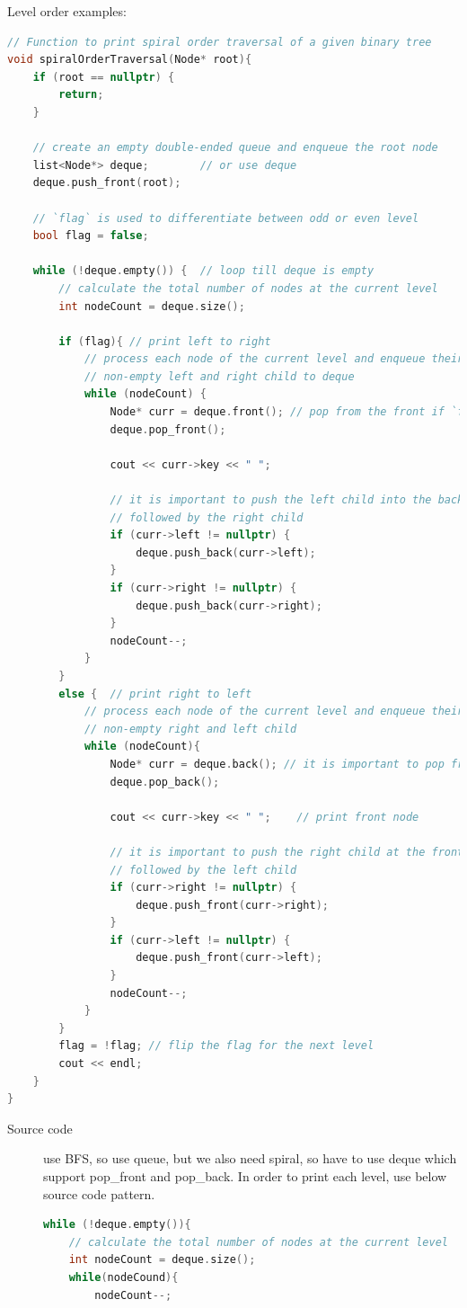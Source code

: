 \documentclass[a4paper,11pt,twoside]{book}
\begin{document}
	\par Level order examples:
\begin{lstlisting}[frame=single, language=c++]
// Function to print spiral order traversal of a given binary tree
void spiralOrderTraversal(Node* root){
	if (root == nullptr) {
		return;
	}
	
	// create an empty double-ended queue and enqueue the root node
	list<Node*> deque;        // or use deque
	deque.push_front(root);
	
	// `flag` is used to differentiate between odd or even level
	bool flag = false;
	
	while (!deque.empty()) {  // loop till deque is empty
		// calculate the total number of nodes at the current level
		int nodeCount = deque.size();
		
		if (flag){ // print left to right
			// process each node of the current level and enqueue their
			// non-empty left and right child to deque
			while (nodeCount) {
				Node* curr = deque.front(); // pop from the front if `flag` is true
				deque.pop_front();
				
				cout << curr->key << " ";
				
				// it is important to push the left child into the back,
				// followed by the right child
				if (curr->left != nullptr) {
					deque.push_back(curr->left);
				}
				if (curr->right != nullptr) {
					deque.push_back(curr->right);
				}
				nodeCount--;
			}
		}
		else {  // print right to left
			// process each node of the current level and enqueue their
			// non-empty right and left child
			while (nodeCount){
				Node* curr = deque.back(); // it is important to pop from the back
				deque.pop_back();
				
				cout << curr->key << " ";    // print front node
				
				// it is important to push the right child at the front,
				// followed by the left child			
				if (curr->right != nullptr) {
					deque.push_front(curr->right);
				}			
				if (curr->left != nullptr) {
					deque.push_front(curr->left);
				}			
				nodeCount--;
			}
		}
		flag = !flag; // flip the flag for the next level
		cout << endl;
	}
}
\end{lstlisting}
\begin{description}
	\item[Source code] use BFS, so use queue, but we also need spiral, so have to use deque which support pop\_front and pop\_back. In order to print each level, use below source code pattern.
\begin{lstlisting}[frame=single, language=c++]
while (!deque.empty()){
	// calculate the total number of nodes at the current level
	int nodeCount = deque.size();	
	while(nodeCound){
		nodeCount--;
\end{lstlisting}	

\end{description}
\end{document}
